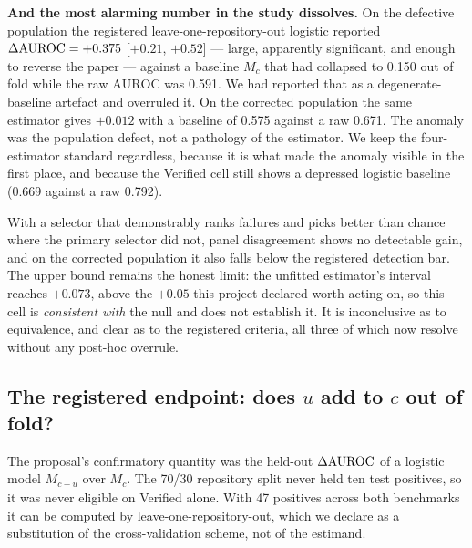 \documentclass[11pt]{article}
\begin{document}
\textbf{And the most alarming number in the study dissolves.} On the defective population the registered leave-one-repository-out logistic reported $\Delta\mathrm{AUROC} = +0.375$ [$+0.21$, $+0.52$] --- large, apparently significant, and enough to reverse the paper --- against a baseline $M_c$ that had collapsed to 0.150 out of fold while the raw $\mathrm{AUROC}$ was 0.591. We had reported that as a degenerate-baseline artefact and overruled it. On the corrected population the same estimator gives $+0.012$ with a baseline of 0.575 against a raw 0.671. The anomaly was the population defect, not a pathology of the estimator. We keep the four-estimator standard regardless, because it is what made the anomaly visible in the first place, and because the Verified cell still shows a depressed logistic baseline (0.669 against a raw 0.792).

With a selector that demonstrably ranks failures and picks better than chance where the primary selector did not, panel disagreement shows no detectable gain, and on the corrected population it also falls below the registered detection bar. The upper bound remains the honest limit: the unfitted estimator's interval reaches $+0.073$, above the $+0.05$ this project declared worth acting on, so this cell is \emph{consistent with} the null and does not establish it. It is inconclusive as to equivalence, and clear as to the registered criteria, all three of which now resolve without any post-hoc overrule.

\subsection{The registered endpoint: does $u$ add to $c$ out of fold?}\label{sec:endpoint}
The proposal's confirmatory quantity was the held-out $\Delta\mathrm{AUROC}$ of a logistic model $M_{c+u}$ over $M_c$. The 70/30 repository split never held ten test positives, so it was never eligible on Verified alone. With 47 positives across both benchmarks it can be computed by leave-one-repository-out, which we declare as a substitution of the cross-validation scheme, not of the estimand.
\end{document}
